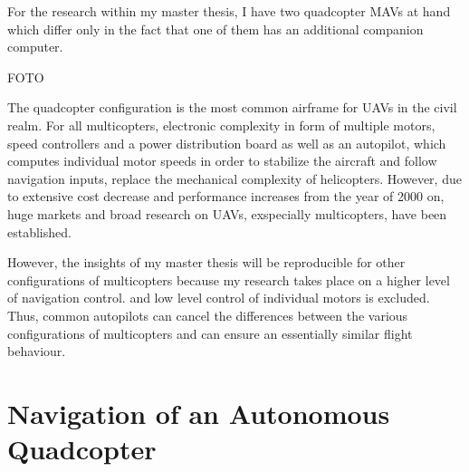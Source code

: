 For the research within my master thesis,
I have two quadcopter MAVs at hand
which differ only in the fact that
one of them has an additional companion
computer.

FOTO



The quadcopter configuration is the most common
airframe for UAVs in the civil realm. 
For all multicopters,
electronic complexity in form of multiple motors,
speed controllers and a power distribution board
as well as an autopilot,
which computes individual motor speeds in order to
stabilize the aircraft and follow navigation inputs,
replace the mechanical complexity of
helicopters. 
However, due to extensive cost decrease
and performance increases from the year of 2000 on,
huge markets and broad research on UAVs, exspecially multicopters,
have been established.



However, the insights of my master thesis
will be reproducible for other configurations
of multicopters because my research
takes place on a higher level of navigation control.
and low level control of individual motors is excluded.
Thus, common autopilots can
cancel the differences between the various
configurations of multicopters and can ensure
an essentially similar flight behaviour.













\section{Navigation of an Autonomous Quadcopter}

